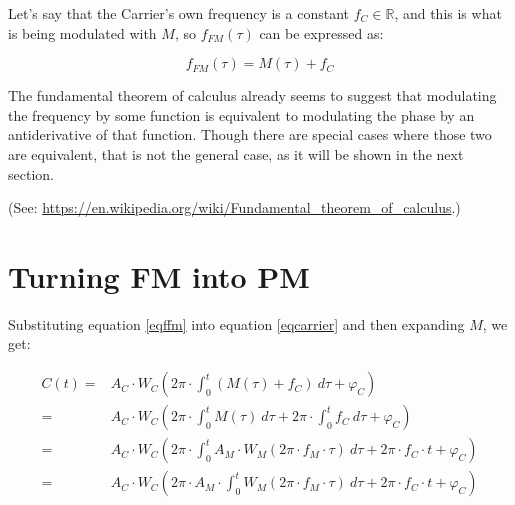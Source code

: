 \documentclass{article}
\begin{document}
    Let's say that the Carrier's own frequency is a constant
    $f_C \in \mathbb{R}$, and this is what is being modulated with $M$, so
    $f_{FM}(\tau)$ can be expressed as:

    \begin{equation}\label{eqffm}
      f_{FM}(\tau) = M(\tau) + f_C
    \end{equation}

    The fundamental theorem of calculus already seems to suggest that
    modulating the frequency by some function is equivalent to modulating the
    phase by an antiderivative of that function. Though there are special cases
    where those two are equivalent, that is not the general case, as it will be
    shown in the next section.

    (See: \url{https://en.wikipedia.org/wiki/Fundamental\_theorem\_of\_calculus}.)

  \section{Turning FM into PM}

    Substituting equation \ref{eqffm} into equation \ref{eqcarrier} and then
    expanding $M$, we get:

    \begin{equation}\label{eqcexp1}
      \begin{split}
        C(t)
          = & A_C \cdot W_C \left(
                2\pi \cdot \int_{0}^{t} \left( M(\tau) + f_C \right) \  d\tau
                + \varphi_C
              \right) \\
          = & A_C \cdot W_C \left(
                2\pi \cdot \int_{0}^{t} M(\tau) \ d\tau
                + 2\pi \cdot \int_{0}^{t} f_C \  d\tau
                + \varphi_C
              \right) \\
          = & A_C \cdot W_C \left(
                2\pi \cdot \int_{0}^{t}
                    A_M \cdot W_M(2\pi \cdot f_M \cdot \tau)
                \ d\tau
                + 2\pi \cdot f_C \cdot t
                + \varphi_C
              \right) \\
          = & A_C \cdot W_C \left(
                2\pi \cdot A_M \cdot \int_{0}^{t}
                    W_M(2\pi \cdot f_M \cdot \tau)
                \ d\tau
                + 2\pi \cdot f_C \cdot t
                + \varphi_C
              \right)
      \end{split}
    \end{equation}
\end{document}
